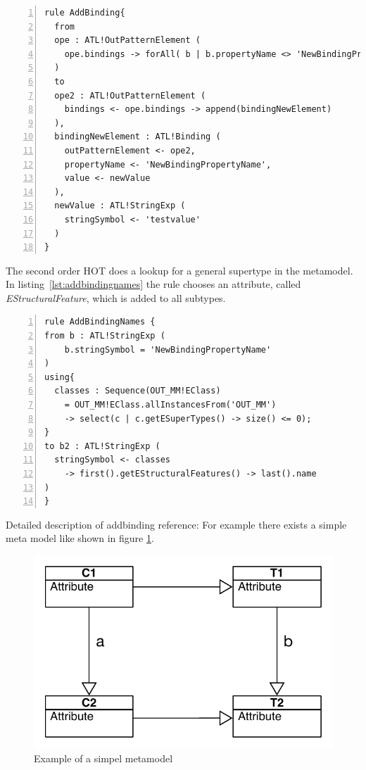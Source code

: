 \documentclass{llncs}
\begin{document}
\begin{lstlisting}[language=ATL, numbers=left,xleftmargin=5.0ex, caption=AddBinding-Definition, label=lst:addbinding]
rule AddBinding{
  from 
  ope : ATL!OutPatternElement ( 
    ope.bindings -> forAll( b | b.propertyName <> 'NewBindingPropertyName')
  )
  to
  ope2 : ATL!OutPatternElement (
    bindings <- ope.bindings -> append(bindingNewElement)
  ), 
  bindingNewElement : ATL!Binding (
    outPatternElement <- ope2,
    propertyName <- 'NewBindingPropertyName',
    value <- newValue	
  ),
  newValue : ATL!StringExp (
    stringSymbol <- 'testvalue'
  )	
}
\end{lstlisting}

The second order HOT does a lookup for a general supertype in the metamodel. In listing~\ref{lst:addbindingnames} the rule chooses an attribute, called \emph{EStructuralFeature}, which is added to all subtypes.

\begin{lstlisting}[language=ATL, numbers=left,xleftmargin=5.0ex, caption=AddBindingNames-Definition., label=lst:addbindingnames]
rule AddBindingNames {
from b : ATL!StringExp (
    b.stringSymbol = 'NewBindingPropertyName'
)
using{
  classes : Sequence(OUT_MM!EClass) 
	= OUT_MM!EClass.allInstancesFrom('OUT_MM') 
	-> select(c | c.getESuperTypes() -> size() <= 0);
}
to b2 : ATL!StringExp ( 
  stringSymbol <- classes 
	-> first().getEStructuralFeatures() -> last().name
)	
}
\end{lstlisting}

Detailed description of addbinding reference:
For example there exists a simple meta model like shown in figure
\ref{fig:simple_metamodel}.

\begin{figure}
	\centering
	\includegraphics[angle=0,width=1\textwidth,natwidth=610,natheight=642]{figures/SimpleMM.pdf}
	\caption{Example of a simpel metamodel}
	\label{fig:simple_metamodel}
\end{figure}
\end{document}
